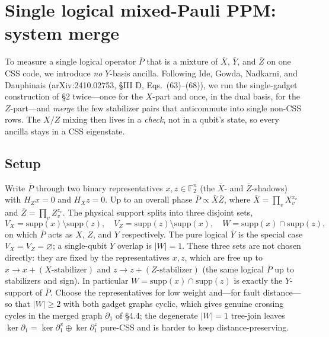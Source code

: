 \documentclass[a4paper, 12pt]{article}
\begin{document}
\section{Single logical mixed-Pauli PPM: system merge}

To measure a single logical operator $\bar P$ that is a mixture of $\bar X$, $\bar Y$, and
$\bar Z$ on one CSS code, we introduce \emph{no} $Y$-basis ancilla. Following Ide, Gowda,
Nadkarni, and Dauphinais (arXiv:2410.02753, \S III D, Eqs.~(63)--(68)), we run the
single-gadget construction of \S 2 twice---once for the $X$-part and once, in the dual basis,
for the $Z$-part---and \emph{merge} the few stabilizer pairs that anticommute into single
non-CSS rows. The $X/Z$ mixing then lives in a \emph{check}, not in a qubit's state, so every
ancilla stays in a CSS eigenstate.

\subsection{Setup}
Write $\bar P$ through two binary representatives $x, z \in \mathbb{F}_2^n$ (the $\bar X$- and
$\bar Z$-shadows) with $H_Z x = 0$ and $H_X z = 0$. Up to an overall phase
$\bar P \propto \bar X \bar Z$, where $\bar X = \prod_v X_v^{x_v}$ and
$\bar Z = \prod_v Z_v^{z_v}$. The physical support splits into three disjoint sets,
\begin{equation}
V_X = \mathrm{supp}(x)\setminus\mathrm{supp}(z), \quad
V_Z = \mathrm{supp}(z)\setminus\mathrm{supp}(x), \quad
W   = \mathrm{supp}(x)\cap\mathrm{supp}(z),
\end{equation}
on which $\bar P$ acts as $X$, $Z$, and $Y$ respectively. The pure logical $\bar Y$ is the
special case $V_X = V_Z = \varnothing$; a single-qubit $\bar Y$ overlap is $|W| = 1$. These three
sets are not chosen directly: they are fixed by the representatives $x, z$, which are free up to
$x \to x + (\text{$X$-stabilizer})$ and $z \to z + (\text{$Z$-stabilizer})$ (the same logical
$\bar P$ up to stabilizers and sign). In particular $W = \mathrm{supp}(x)\cap\mathrm{supp}(z)$ is
exactly the $Y$-support of $\bar P$. Choose the representatives for low weight and---for fault
distance---so that $|W|\geq 2$ with both gadget graphs cyclic, which gives genuine crossing cycles
in the merged graph $\partial_1$ of \S 4.4; the degenerate $|W|=1$ tree-join leaves
$\ker \partial_1 = \ker\partial_1^{x} \oplus \ker\partial_1^{z}$ pure-CSS and is harder to keep
distance-preserving.
\end{document}
